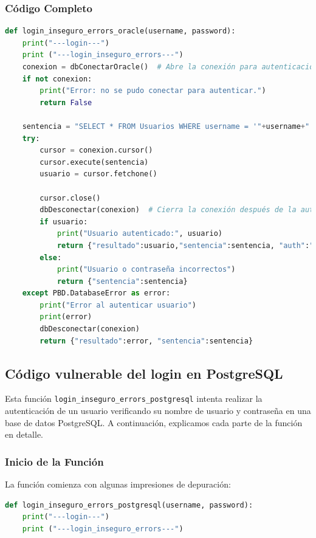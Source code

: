 \documentclass[a4paper,12pt]{article}
\begin{document}
\subsubsection{Código Completo}
\begin{lstlisting}[language=Python]
def login_inseguro_errors_oracle(username, password):
    print("---login---")
    print ("---login_inseguro_errors---")
    conexion = dbConectarOracle()  # Abre la conexión para autenticación
    if not conexion:
        print("Error: no se pudo conectar para autenticar.")
        return False

    sentencia = "SELECT * FROM Usuarios WHERE username = '"+username+"' AND password = '"+password+"'"
    try:
        cursor = conexion.cursor()
        cursor.execute(sentencia)
        usuario = cursor.fetchone()

        cursor.close()
        dbDesconectar(conexion)  # Cierra la conexión después de la autenticación
        if usuario:
            print("Usuario autenticado:", usuario)
            return {"resultado":usuario,"sentencia":sentencia, "auth":"true"}
        else:
            print("Usuario o contraseña incorrectos")
            return {"sentencia":sentencia}
    except PBD.DatabaseError as error:
        print("Error al autenticar usuario")
        print(error)
        dbDesconectar(conexion)
        return {"resultado":error, "sentencia":sentencia}
\end{lstlisting}

\subsection{Código vulnerable del login en PostgreSQL}

Esta función \texttt{login\_inseguro\_errors\_postgresql} intenta realizar la autenticación de un usuario verificando su nombre de usuario y contraseña en una base de datos PostgreSQL. A continuación, explicamos cada parte de la función en detalle.

\subsubsection{Inicio de la Función}
La función comienza con algunas impresiones de depuración:

\begin{lstlisting}[language=Python]
def login_inseguro_errors_postgresql(username, password):
    print("---login---")
    print ("---login_inseguro_errors---")
\end{lstlisting}
\end{document}
